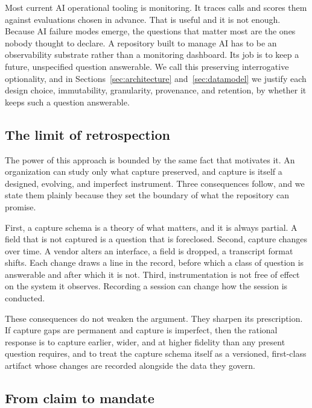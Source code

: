 \documentclass[11pt]{article}
\begin{document}
Most current AI operational tooling is monitoring. It traces calls and scores
them against evaluations chosen in advance. That is useful and it is not
enough. Because AI failure modes emerge, the questions that matter most are the
ones nobody thought to declare. A repository built to manage AI has to be an
observability substrate rather than a monitoring dashboard. Its job is to keep a
future, unspecified question answerable. We call this preserving interrogative
optionality, and in Sections~\ref{sec:architecture} and~\ref{sec:datamodel} we
justify each design choice, immutability, granularity, provenance, and
retention, by whether it keeps such a question answerable.

\subsection{The limit of retrospection}

The power of this approach is bounded by the same fact that motivates it. An
organization can study only what capture preserved, and capture is itself a
designed, evolving, and imperfect instrument. Three consequences follow, and we
state them plainly because they set the boundary of what the repository can
promise.

First, a capture schema is a theory of what matters, and it is always partial.
A field that is not captured is a question that is foreclosed. Second, capture
changes over time. A vendor alters an interface, a field is dropped, a transcript
format shifts. Each change draws a line in the record, before which a class of
question is answerable and after which it is not. Third, instrumentation is not
free of effect on the system it observes. Recording a session can change how the
session is conducted.

These consequences do not weaken the argument. They sharpen its prescription. If
capture gaps are permanent and capture is imperfect, then the rational response
is to capture earlier, wider, and at higher fidelity than any present question
requires, and to treat the capture schema itself as a versioned, first-class
artifact whose changes are recorded alongside the data they govern.

\subsection{From claim to mandate}
\end{document}
